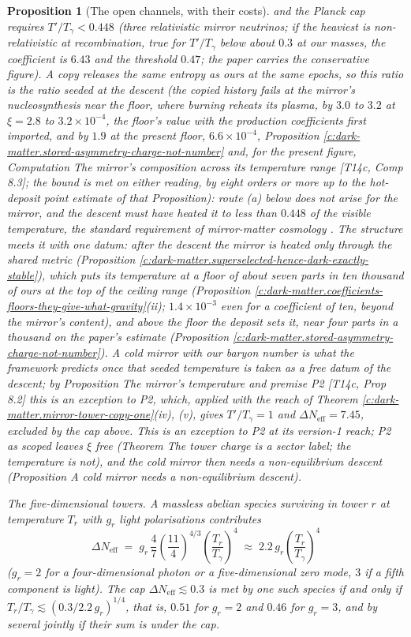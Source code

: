 \documentclass[11pt]{article}
\newtheorem{proposition}[theorem]{Proposition}
\theoremstyle{definition}
\theoremstyle{plain}
\providecommand{\Neff}{}\renewcommand{\Neff}{N_{\mathrm{eff}}}
\begin{document}
\begin{proposition}[The open channels, with their costs]
and the Planck cap requires $T'/T_{\gamma} < 0.448$ (three relativistic mirror neutrinos; if the heaviest is non-relativistic at recombination, true for $T'/T_{\gamma}$ below about $0.3$ at our masses, the coefficient is $6.43$ and the threshold $0.47$; the paper carries the conservative figure). A copy releases the same entropy as ours at the same epochs, so this ratio is the ratio \emph{seeded at the descent} (the copied history fails at the mirror's nucleosynthesis near the floor, where burning reheats its plasma, by $3.0$ to $3.2$ at $\xi = 2.8$ to $3.2 \times 10^{-4}$, the floor's value with the production coefficients first imported, and by $1.9$ at the present floor, $6.6 \times 10^{-4}$, Proposition \ref{c:dark-matter.stored-asymmetry-charge-not-number} and, for the present figure, Computation \emph{The mirror's composition across its temperature range} [T14c, Comp 8.3]; the bound is met on either reading, by eight orders or more up to the hot-deposit point estimate of that Proposition): route (a) below does not arise for the mirror, and the descent must have heated it to less than $0.448$ of the visible temperature, the standard requirement of mirror-matter cosmology \cite{FootMirror2004}. The structure meets it with one datum: after the descent the mirror is heated only through the shared metric (Proposition \ref{c:dark-matter.superselected-hence-dark-exactly-stable}), which puts its temperature at a floor of about seven parts in ten thousand of ours at the top of the ceiling range (Proposition \ref{c:dark-matter.coefficients-floors-they-give-what-gravity}(ii); $1.4 \times 10^{-3}$ even for a coefficient of ten, beyond the mirror's content), and above the floor the deposit sets it, near four parts in a thousand on the paper's estimate (Proposition \ref{c:dark-matter.stored-asymmetry-charge-not-number}). A cold mirror with our baryon number is what the framework predicts once that seeded temperature is taken as a free datum of the descent; by Proposition \emph{The mirror's temperature and premise P2} [T14c, Prop 8.2] this is an exception to P2, which, applied with the reach of Theorem \ref{c:dark-matter.mirror-tower-copy-one}(iv), (v), gives $T'/T_{\gamma} = 1$ and $\Delta\Neff = 7.45$, excluded by the cap above. This is an exception to P2 at its version-1 reach; P2 as scoped leaves $\xi$ free (Theorem \emph{The tower charge is a sector label; the temperature is not}), and the cold mirror then needs a non-equilibrium descent (Proposition \emph{A cold mirror needs a non-equilibrium descent}).

\emph{The five-dimensional towers.} A massless abelian species surviving in tower $r$ at temperature $T_{r}$ with $g_{r}$ light polarisations contributes
\[
\Delta\Neff \;=\; g_{r}\,\frac{4}{7}\left(\frac{11}{4}\right)^{4/3}\left(\frac{T_{r}}{T_{\gamma}}\right)^{4} \;\approx\; 2.2\,g_{r}\left(\frac{T_{r}}{T_{\gamma}}\right)^{4}
\]
($g_{r} = 2$ for a four-dimensional photon or a five-dimensional zero mode, $3$ if a fifth component is light). The cap $\Delta\Neff \lesssim 0.3$ is met by one such species if and only if $T_{r}/T_{\gamma} \lesssim (0.3/2.2\,g_{r})^{1/4}$, that is, $0.51$ for $g_{r} = 2$ and $0.46$ for $g_{r} = 3$, and by several jointly if their sum is under the cap.


\end{proposition}
\end{document}
